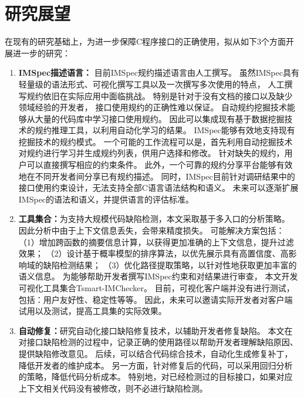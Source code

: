 \section{研究展望}
\label{sec:5.2}
在现有的研究基础上，为进一步保障C程序接口的正确使用，拟从如下3个方面开展进一步的研究：
\begin{enumerate}
	\item \textbf{IMSpec描述语言：}
	目前IMSpec规约描述语言由人工撰写。
	虽然IMSpec具有轻量级的语法形式、可视化撰写工具以及一次撰写多次使用的特点，
	人工撰写规约依旧在实际应用中面临挑战。
	特别是针对于没有文档的接口以及缺少领域经验的开发者，
	接口使用规约的正确性难以保证。
	自动规约挖掘技术能够从大量的代码库中学习接口使用规约。
	因此可以集成现有基于数据挖掘技术的规约推理工具，以利用自动化学习的结果。
	IMSpec能够有效地支持现有挖掘技术的规约模式。
	一个可能的工作流程可以是，首先利用自动挖掘技术对规约进行学习并生成规约列表，供用户选择和修改。
	针对缺失的规约，用户可以直接撰写相应的约束条件。
	此外，一个可靠的规约分享平台能够有效地在不同开发者间分享已有规约描述。
	同时，IMSpec目前针对调研结果中的接口使用约束设计，无法支持全部C语言语法结构和语义。
	未来可以逐渐扩展IMSpec的语法和语义，并提供语言的评估标准。
	
	\item \textbf{工具集合：}为支持大规模代码缺陷检测，本文采取基于多入口的分析策略。
	因此分析中由于上下文信息丢失，会带来精度损失。
	可能解决方案包括：
	（1）增加跨函数的摘要信息计算，以获得更加准确的上下文信息，提升过滤效果；
	（2）设计基于概率模型的排序算法，以优先展示具有高置信度、高影响域的缺陷检测结果；
	（3）优化路径提取策略，以针对性地获取更加丰富的语义信息。
	为能够帮助开发者撰写IMSpec约束和对结果进行审查，
	本文开发可视化工具集合Tsmart-IMChecker。
	目前，可视化客户端并没有进行测试，包括：用户友好性、稳定性等等。
	因此，未来可以邀请实际开发者对客户端试用以及测试，提高工具集的实际效果。
	
	
	\item \textbf{自动修复：}研究自动化接口缺陷修复技术，以辅助开发者修复缺陷。
	本文在对接口缺陷检测的过程中，记录正确的使用路径以帮助开发者理解缺陷原因、提供缺陷修改意见。
	后续，可以结合代码综合技术，自动化生成修复补丁，降低开发者的维护成本。
	另一方面，针对修复后的代码，可以采用回归分析的策略，降低代码分析成本。
	特别地，对已经检测过的目标接口，如果对应上下文相关代码没有被修改，则不必进行缺陷检测。
\end{enumerate}

